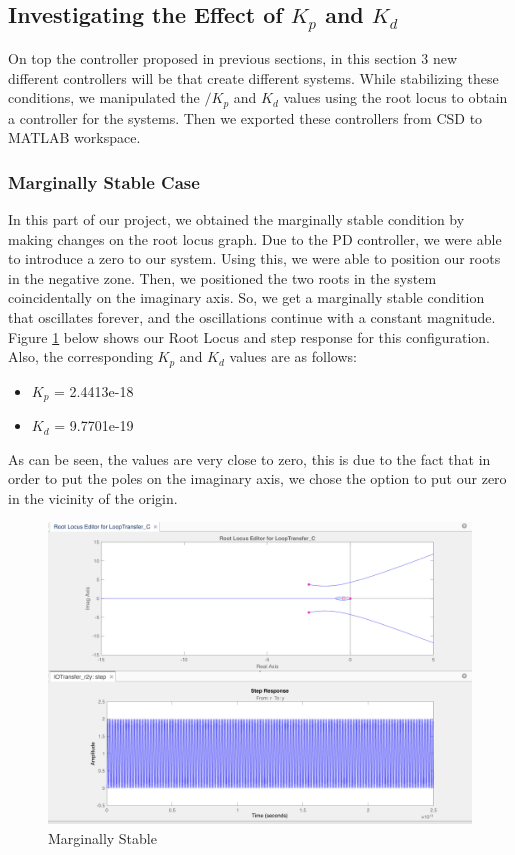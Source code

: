\subsection{Investigating the Effect of $K_p$ and $K_d$}
On top the controller proposed in previous sections, in this section 3 new different controllers will be that create different systems. While stabilizing these conditions, we manipulated the $/K_p$ and $K_d$ values using the root locus to obtain a controller for the systems. Then we exported these controllers from CSD to MATLAB workspace.

\subsubsection{Marginally Stable Case}
In this part of our project, we obtained the marginally stable condition by making changes on the root locus graph. Due to the PD controller, we were able to introduce a zero to our system. Using this, we were able to position our roots in the negative zone. Then, we positioned the two roots in the system coincidentally on the imaginary axis. So, we get a marginally stable condition that oscillates forever, and the oscillations continue with a constant magnitude. Figure \ref{fig:marg_stab_csd} below shows our Root Locus and step response for this configuration. Also, the corresponding $K_p$ and $K_d$ values are as follows:
\begin{itemize}
    \item $K_p$ = 2.4413e-18
    \item$K_d$ = 9.7701e-19
\end{itemize}

As can be seen, the values are very close to zero, this is due to the fact that in order to put the poles on the imaginary axis, we chose the option to put our zero in the vicinity of the origin.

\begin{figure}[H]
    \centering
    \includegraphics[width=.85\textwidth]{images/marg_stable_csd.png}
    \caption{Marginally Stable}
    \label{fig:marg_stab_csd}
\end{figure}

